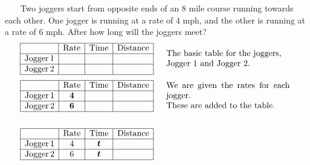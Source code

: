 \begin{example}\label{Lin86}~~~ Two joggers start from opposite ends of an 8 mile course running towards
  each other. One jogger is running at a rate of 4 mph, and the other is
  running at a rate of 6 mph. After how long will the joggers meet?
  \begin{eqnarray*}
    \begin{array}{|c|c|c|c|}
      \hline
      & \tmop{Rate} & \tmop{Time} & \tmop{Distance}\\
      \hline
      \tmop{Jogger} 1 &  &  & \\
      \hline
      \tmop{Jogger} 2 &  &  & \\
      \hline
    \end{array} &  & \begin{array}{p{0.425\textwidth}}\tmop{The} \tmop{basic} \tmop{table} \tmop{for} \tmop{the} \tmop{joggers},\\ \tmop{Jogger~1} \tmop{and} \tmop{Jogger~2}.\end{array}%
\end{eqnarray*}
\begin{eqnarray*}
   \begin{array}{|c|c|c|c|}
      \hline
      & \tmop{Rate} & \tmop{Time} & \tmop{Distance}\\
      \hline
      \tmop{Jogger} 1 & \tmmathbf{4} &  & \\
      \hline
      \tmop{Jogger} 2 & \tmmathbf{6} &  & \\
      \hline
    \end{array} &  & \begin{array}{p{0.425\textwidth}}
      \tmop{We} \tmop{are} \tmop{given} \tmop{the} \tmop{rates} \tmop{for}
      \tmop{each} \tmop{jogger}.\\
      \tmop{These} \tmop{are} \tmop{added} \tmop{to} \tmop{the} \tmop{table}.
    \end{array}\\
    &  & \\
    \begin{array}{|c|c|c|c|}
      \hline
      & \tmop{Rate} & \tmop{Time} & \tmop{Distance}\\
      \hline
      \tmop{Jogger} 1 & 4 & \tmmathbf{t} & \\
      \hline
      \tmop{Jogger} 2 & 6 & \tmmathbf{t} & \\
      \hline
    \end{array} &  & \begin{array}{p{0.425\textwidth}}

\end{array}
\end{eqnarray*}
\end{example}
